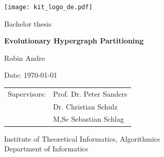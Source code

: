 \documentclass[a4paper,12pt,titlepage, BCOR7mm,headsepline]{scrbook}
\numberwithin{equation}{section}
\begin{document}
%


\pagestyle{empty} %
\renewcommand{\thepage}{\roman{page}}

\begin{titlepage}

  \begin{center}\large
  \begin{flushleft}
    \quad\texttt{[image: kit\_logo\_de.pdf]} \hfill

\end{flushleft}
    \vfill
    \vfill
    \vfill
    \vfill

    Bachelor thesis
    \vspace*{2cm}

    {\bf\huge Evolutionary Hypergraph Partitioning  \par}

    \vfill

    Robin Andre

    \vspace*{15mm}

    Date: \today 

    \vspace*{40mm}
    \begin{tabular}{rl}
      Supervisors: & Prof. Dr. Peter Sanders \\
      & Dr. Christian Schulz \\
      & M,Sc Sebastian Schlag
    \end{tabular}
    
    \vspace*{10mm}


    \vspace*{10mm}
     Institute of Theoretical Informatics, Algorithmics \\
     Department of Informatics \\

    \vspace*{12mm}
    \vfill
  \end{center}

\end{titlepage}
\end{document}
